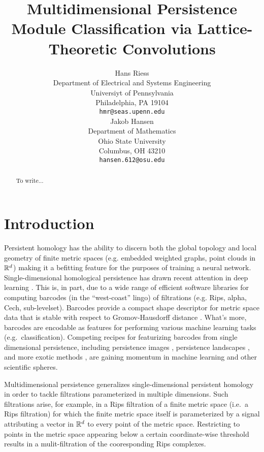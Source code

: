 \documentclass{article}
\title{Multidimensional Persistence Module Classification via Lattice-Theoretic Convolutions}
\author{%
  Hans Riess  \\
  Department of Electrical and Systems Engineering \\
  Universiyt of Pennsylvania\\
  Philadelphia, PA 19104 \\
  \texttt{hmr@seas.upenn.edu} \\
  \And
  Jakob Hansen \\
  Department of Mathematics \\
  Ohio State University \\
  Columbus, OH 43210 \\
  \texttt{hansen.612@osu.edu}
}
\begin{document}
\maketitle

\begin{abstract}
 To write...
\end{abstract}

\section{Introduction}

Persistent homology has the ability to discern both the global topology \cite{ghrist_barcodes:_2008}
and local geometry \cite{} of finite metric spaces (e.g. embedded weighted
graphs, point clouds in $\mathbb{R}^d$) making it a befitting feature for the purposes of
training a neural network. Single-dimensional homological persistence has drawn
recent attention in deep learning \cite{hofer_deep_2017,pun_persistent-homology-based_2018,bruel-gabrielsson_topology_2020}. This is, in part, due to a wide range
of efficient software libraries \cite{otter_roadmap_2017,henselman_matroid_2017,bauer_ripser:_2019} for computing barcodes (in the
``west-coast'' lingo) of filtrations (e.g. Rips, alpha, {C}ech, sub-levelset).
Barcodes provide a compact shape descriptor for metric space data that
is stable with respect to Gromov-Hausdorff distance \cite{}. What's more, barcodes are encodable as features for performing various machine learning tasks (e.g.~classification). Competing recipes for featurizing barcodes from single dimensional persistence, including persistence images \cite{}, persistence landscapes \cite{}, and more exotic methods \cite{tropical}, are gaining momentum in machine learning and other scientific spheres.

Multidimensional persistence generalizes single-dimensional persistent homology in order to tackle filtrations parameterized in multiple dimensions.
Such filtrations arise, for example, in a Rips filtration of a finite metric space (i.e.~a Rips filtration) for which the finite metric space itself is parameterized by a signal attributing a vector in $\mathbb{R}^d$ to every point of the metric space. Restricting to points in the metric space appearing below a certain coordinate-wise threshold results in a mulit-filtration of the cooresponding Rips complexes.
\end{document}
